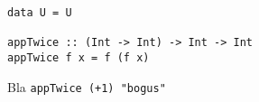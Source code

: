\documentclass[12pt]{article}
\begin{document}
\maketitle
\abstract{}

\tableofcontents
\begin{verbatim}
data U = U

appTwice :: (Int -> Int) -> Int -> Int
appTwice f x = f (f x)
\end{verbatim}
Bla \texttt{appTwice (+1) "bogus"}

\newpage
{}




\newpage


\end{document}
